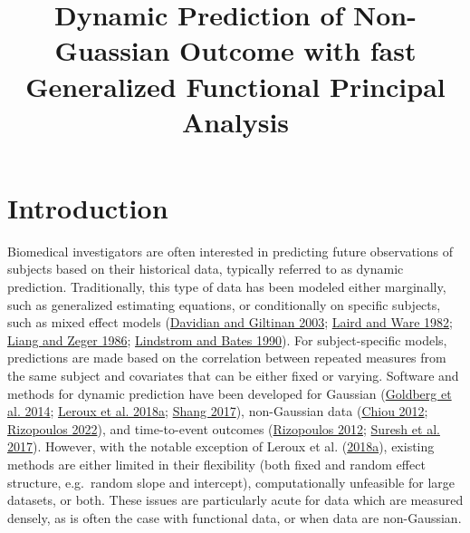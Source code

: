 \documentclass[
  11pt,
]{article}
\title{Dynamic Prediction of Non-Guassian Outcome with fast Generalized
Functional Principal Analysis}
\author{}
\date{\vspace{-2.5em}}
\begin{document}
\maketitle

\hypertarget{introduction}{%
\section{Introduction}\label{introduction}}

Biomedical investigators are often interested in predicting future
observations of subjects based on their historical data, typically
referred to as dynamic prediction. Traditionally, this type of data has
been modeled either marginally, such as generalized estimating
equations, or conditionally on specific subjects, such as mixed effect
models (\protect\hyperlink{ref-davidian2003}{Davidian and Giltinan
2003}; \protect\hyperlink{ref-Laird1982}{Laird and Ware 1982};
\protect\hyperlink{ref-liang1986}{Liang and Zeger 1986};
\protect\hyperlink{ref-lindstrom1990}{Lindstrom and Bates 1990}). For
subject-specific models, predictions are made based on the correlation
between repeated measures from the same subject and covariates that can
be either fixed or varying. Software and methods for dynamic prediction
have been developed for Gaussian
(\protect\hyperlink{ref-goldberg2014}{Goldberg et al. 2014};
\protect\hyperlink{ref-leroux2016}{Leroux et al. 2018a};
\protect\hyperlink{ref-shang2017}{Shang 2017}), non-Gaussian data
(\protect\hyperlink{ref-chiou2012}{Chiou 2012};
\protect\hyperlink{ref-GLMMadaptive}{Rizopoulos 2022}), and
time-to-event outcomes (\protect\hyperlink{ref-jmbook}{Rizopoulos 2012};
\protect\hyperlink{ref-suresh2017}{Suresh et al. 2017}). However, with
the notable exception of Leroux et al.
(\protect\hyperlink{ref-leroux2016}{2018a}), existing methods are either
limited in their flexibility (both fixed and random effect structure,
e.g.~random slope and intercept), computationally unfeasible for large
datasets, or both. These issues are particularly acute for data which
are measured densely, as is often the case with functional data, or when
data are non-Gaussian.
\end{document}
